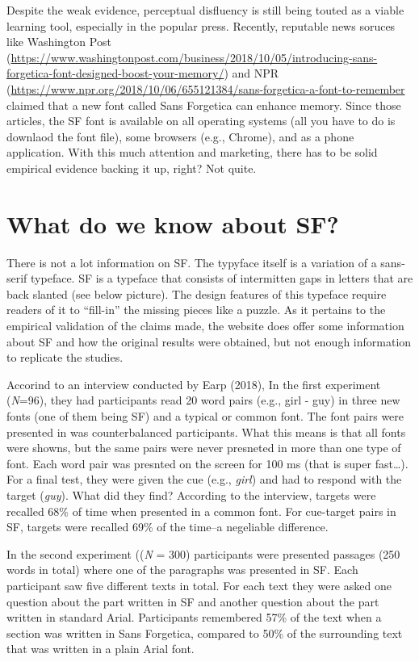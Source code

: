 \documentclass[pdf]{apa6}
\begin{document}
Despite the weak evidence, perceptual disfluency is still being touted as a viable learning tool, especially in the popular press. Recently, reputable news soruces like Washington Post (\url{https://www.washingtonpost.com/business/2018/10/05/introducing-sans-forgetica-font-designed-boost-your-memory/}) and NPR (\url{https://www.npr.org/2018/10/06/655121384/sans-forgetica-a-font-to-remember} claimed that a new font called Sans Forgetica can enhance memory. Since those articles, the SF font is available on all operating systems (all you have to do is downlaod the font file), some browsers (e.g., Chrome), and as a phone application. With this much attention and marketing, there has to be solid empirical evidence backing it up, right? Not quite.

\hypertarget{what-do-we-know-about-sf}{%
\section{What do we know about SF?}\label{what-do-we-know-about-sf}}

There is not a lot information on SF. The typyface itself is a variation of a sans-serif typeface. SF is a typeface that consists of intermitten gaps in letters that are back slanted (see below picture). The design features of this typeface require readers of it to \enquote{fill-in} the missing pieces like a puzzle. As it pertains to the empirical validation of the claims made, the website does offer some information about SF and how the original results were obtained, but not enough information to replicate the studies.

Accorind to an interview conducted by Earp (2018), In the first experiment (\emph{N}=96), they had participants read 20 word pairs (e.g., girl - guy) in three new fonts (one of them being SF) and a typical or common font. The font pairs were presented in was counterbalanced participants. What this means is that all fonts were showns, but the same pairs were never presneted in more than one type of font. Each word pair was presnted on the screen for 100 ms (that is super fast\ldots{}). For a final test, they were given the cue (e.g., \emph{girl}) and had to respond with the target (\emph{guy}). What did they find? According to the interview, targets were recalled 68\% of time when presented in a common font. For cue-target pairs in SF, targets were recalled 69\% of the time--a negeliable difference.

In the second experiment ((\emph{N} = 300) participants were presented passages (250 words in total) where one of the paragraphs was presented in SF. Each participant saw five different texts in total. For each text they were asked one question about the part written in SF and another question about the part written in standard Arial. Participants remembered 57\% of the text when a section was written in Sans Forgetica, compared to 50\% of the surrounding text that was written in a plain Arial font.
\end{document}
